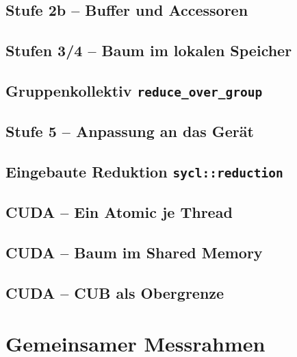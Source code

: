 \documentclass[12pt,a4paper]{article}
\begin{document}
\subsection{Stufe 2b -- Buffer und Accessoren}


\subsection{Stufen 3/4 -- Baum im lokalen Speicher}


\subsection{Gruppenkollektiv \texttt{reduce\_over\_group}}


\subsection{Stufe 5 -- Anpassung an das Gerät}


\subsection{Eingebaute Reduktion \texttt{sycl::reduction}}


\subsection{CUDA -- Ein Atomic je Thread}


\subsection{CUDA -- Baum im Shared Memory}


\subsection{CUDA -- CUB als Obergrenze}


\newpage
\section{Gemeinsamer Messrahmen}\label{sec:anhang-rahmen}
\end{document}
